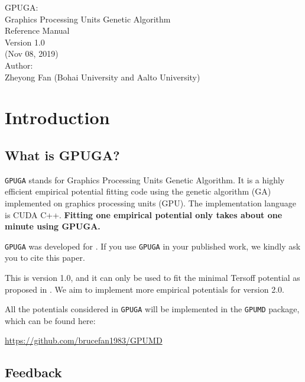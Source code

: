 \documentclass[12pt,a4paper]{report}
\begin{document}
\begin{center}
  \huge
  {
   \vspace*{1.0cm}
   GPUGA: \\
   Graphics Processing Units Genetic Algorithm \\
   \vspace*{1.0cm}
   Reference Manual\\
   \vspace*{1.0cm}
   Version 1.0 \\
   \vspace*{1.0cm}
   (Nov 08, 2019)\\
  \vspace*{2.0cm}
  }
  \large
  {
  Author: \\
  Zheyong Fan (Bohai University and Aalto University)\\
  }
  \vspace*{1.0cm}
\end{center}

\tableofcontents

\chapter{Introduction\label{chapter:introduction}}

\section{What is GPUGA?}

\verb"GPUGA" stands for Graphics Processing Units Genetic Algorithm. It is a highly efficient empirical potential fitting code using the genetic algorithm (GA) implemented on graphics processing units (GPU). The implementation language is CUDA C++. \textbf{Fitting one empirical potential only takes about one minute using GPUGA. }

\verb"GPUGA" was developed for \cite{fan2019arxiv}. If you use \verb"GPUGA" in your published work, we kindly ask you to cite this paper.

This is version 1.0, and it can only be used to fit the minimal Tersoff potential as proposed in \cite{fan2019arxiv}. We aim to implement more empirical potentials for version 2.0.

All the potentials considered in \verb"GPUGA" will be implemented in the \verb"GPUMD" package, which can be found here:

\url{https://github.com/brucefan1983/GPUMD}

\section{Feedback}
\end{document}
